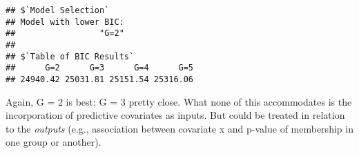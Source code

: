 \documentclass[
]{article}
\begin{document}
\begin{verbatim}
## $`Model Selection`
## Model with lower BIC: 
##                 "G=2" 
## 
## $`Table of BIC Results`
##      G=2      G=3      G=4      G=5 
## 24940.42 25031.81 25151.54 25316.06
\end{verbatim}

Again, G = 2 is best; G = 3 pretty close. What none of this accommodates
is the incorporation of predictive covariates as inputs. But could be
treated in relation to the \emph{outputs} (e.g., association between
covariate x and p-value of membership in one group or another).
\end{document}
